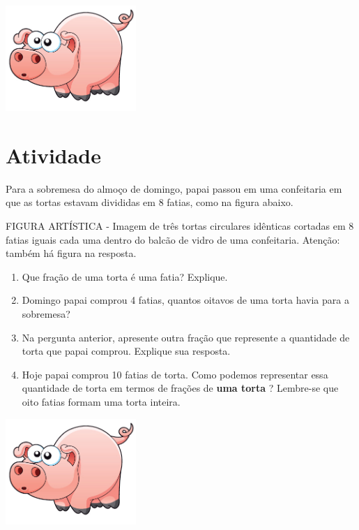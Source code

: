 \documentclass[a4,12pt]{book}
\begin{document}
\includegraphics[width=\textwidth,height=4cm, keepaspectratio]{pig}
\section{Atividade}







Para a sobremesa do almoço de domingo, papai passou em uma confeitaria em que as tortas estavam divididas em 8 fatias, como na figura abaixo.

\begin{imagem*}[breakable]{}{}   FIGURA ARTÍSTICA - Imagem de três tortas circulares idênticas cortadas em 8 fatias iguais cada uma dentro do balcão de vidro de uma confeitaria. Atenção: também há figura na resposta.
\end{imagem*}

\begin{enumerate} [\quad a)] %
  \item     Que fração de uma torta é uma fatia? Explique.
  \item     Domingo papai comprou 4 fatias, quantos oitavos de uma torta havia para a sobremesa?
  \item     Na pergunta anterior, apresente outra fração que represente a quantidade de torta que papai comprou. Explique sua resposta.
  \item     Hoje papai comprou 10 fatias de torta. Como podemos representar essa quantidade de torta em termos de frações de     {\bf uma torta}    ? Lembre-se que oito fatias formam uma torta inteira.
\end{enumerate} %






\includegraphics[width=\textwidth,height=4cm, keepaspectratio]{pig}
\end{document}
